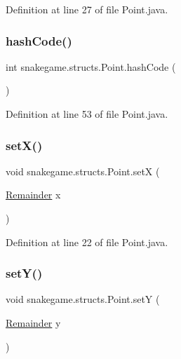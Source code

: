 Definition at line 27 of file Point.\+java.

\mbox{\label{classsnakegame_1_1structs_1_1_point_a29332641bab79c8e403a6429d640e5f7}} 
\subsubsection{\texorpdfstring{hash\+Code()}{hashCode()}}
{\footnotesize\ttfamily int snakegame.\+structs.\+Point.\+hash\+Code (\begin{DoxyParamCaption}{ }\end{DoxyParamCaption})}



Definition at line 53 of file Point.\+java.

\mbox{\label{classsnakegame_1_1structs_1_1_point_a9efa9a335cccdbf667d1304c123e7ca9}} 
\subsubsection{\texorpdfstring{set\+X()}{setX()}}
{\footnotesize\ttfamily void snakegame.\+structs.\+Point.\+setX (\begin{DoxyParamCaption}\item[{\mbox{\hyperlink{classsnakegame_1_1structs_1_1_remainder}{Remainder}}}]{x }\end{DoxyParamCaption})}



Definition at line 22 of file Point.\+java.

\mbox{\label{classsnakegame_1_1structs_1_1_point_a9d42e4e18c765dcbfd14ef4baa102367}} 
\subsubsection{\texorpdfstring{set\+Y()}{setY()}}
{\footnotesize\ttfamily void snakegame.\+structs.\+Point.\+setY (\begin{DoxyParamCaption}\item[{\mbox{\hyperlink{classsnakegame_1_1structs_1_1_remainder}{Remainder}}}]{y }\end{DoxyParamCaption})}




